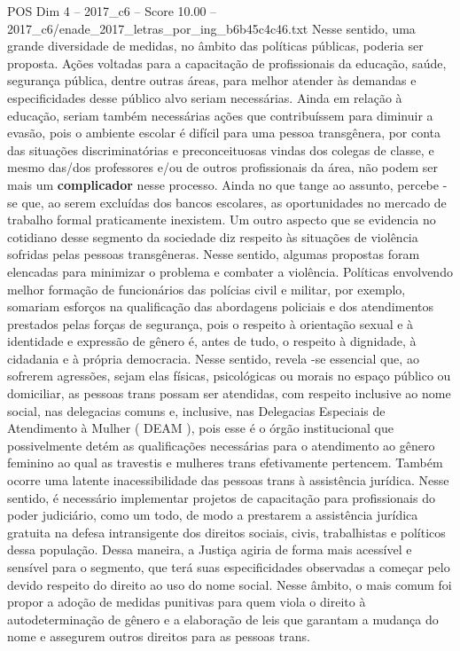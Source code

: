 \begin{textsample}{POS Dim 4 – 2017\_c6 – Score 10.00 – 2017\_c6/enade\_2017\_letras\_por\_ing\_b6b45c4c46.txt}
Nesse sentido, uma grande diversidade de medidas, no âmbito das políticas públicas, poderia ser proposta.
Ações voltadas para a capacitação de profissionais da educação, saúde, segurança pública, dentre outras áreas, para melhor atender às demandas e especificidades desse público alvo seriam necessárias.
Ainda em relação à educação, seriam também necessárias ações que contribuíssem para diminuir a evasão, pois o ambiente escolar é difícil para uma pessoa transgênera, por conta das situações discriminatórias e preconceituosas vindas dos colegas de classe, e mesmo das/dos professores e/ou de outros profissionais da área, não podem ser mais um \textbf{complicador} nesse processo.
Ainda no que tange ao assunto, percebe -se que, ao serem excluídas dos bancos escolares, as oportunidades no mercado de trabalho formal praticamente inexistem.
Um outro aspecto que se evidencia no cotidiano desse segmento da sociedade diz respeito às situações de violência sofridas pelas pessoas transgêneras.
Nesse sentido, algumas propostas foram elencadas para minimizar o problema e combater a violência.
Políticas envolvendo melhor formação de funcionários das polícias civil e militar, por exemplo, somariam esforços na qualificação das abordagens policiais e dos atendimentos prestados pelas forças de segurança, pois o respeito à orientação sexual e à identidade e expressão de gênero é, antes de tudo, o respeito à dignidade, à cidadania e à própria democracia.
Nesse sentido, revela -se essencial que, ao sofrerem agressões, sejam elas físicas, psicológicas ou morais no espaço público ou domiciliar, as pessoas trans possam ser atendidas, com respeito inclusive ao nome social, nas delegacias comuns e, inclusive, nas Delegacias Especiais de Atendimento à Mulher ( DEAM ), pois esse é o órgão institucional que possivelmente detém as qualificações necessárias para o atendimento ao gênero feminino ao qual as travestis e mulheres trans efetivamente pertencem.
Também ocorre uma latente inacessibilidade das pessoas trans à assistência jurídica.
Nesse sentido, é necessário implementar projetos de capacitação para profissionais do poder judiciário, como um todo, de modo a prestarem a assistência jurídica gratuita na defesa intransigente dos direitos sociais, civis, trabalhistas e políticos dessa população.
Dessa maneira, a Justiça agiria de forma mais acessível e sensível para o segmento, que terá suas especificidades observadas a começar pelo devido respeito do direito ao uso do nome social.
Nesse âmbito, o mais comum foi propor a adoção de medidas punitivas para quem viola o direito à autodeterminação de gênero e a elaboração de leis que garantam a mudança do nome e assegurem outros direitos para as pessoas trans.

\end{textsample}
